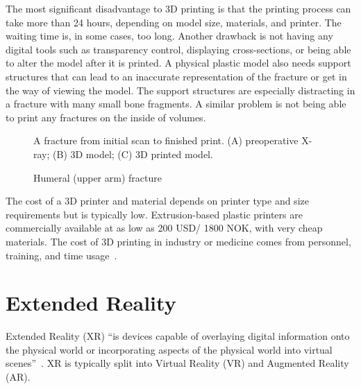 \documentclass[a4paper]{report}
\begin{document}
The most significant disadvantage to 3D printing is that the printing process can take more than 24 hours, depending on model size, materials, and printer. The waiting time is, in some cases, too long.
Another drawback is not having any digital tools such as transparency control, displaying cross-sections, or being able to alter the model after it is printed. 
A physical plastic model also needs support structures that can lead to an inaccurate representation of the fracture or get in the way of viewing the model. The support structures are especially distracting in a fracture with many small bone fragments. A similar problem is not being able to print any fractures on the inside of volumes.

\begin{figure}[h!]
    \centering
	\hfill
  \caption{Humeral (upper arm) fracture}
  \label{3dprint}
  \small
    A fracture from initial scan to finished print. (A) preoperative X-ray; (B) 3D model; (C) 3D printed model.
\end{figure}

The cost of a 3D printer and material depends on printer type and size requirements but is typically low. Extrusion-based plastic printers are commercially available at as low as 200 USD/ 1800 NOK, with very cheap materials. The cost of 3D printing in industry or medicine comes from personnel, training, and time usage~\cite{shahrubudin_overview_2019}.

\section{Extended Reality}

Extended Reality (XR) \enquote{is devices capable of overlaying digital information onto the physical world or incorporating aspects of the physical world into virtual scenes}~\cite{andrews_extended_2019}.
XR is typically split into Virtual Reality (VR) and Augmented Reality (AR).
\end{document}
